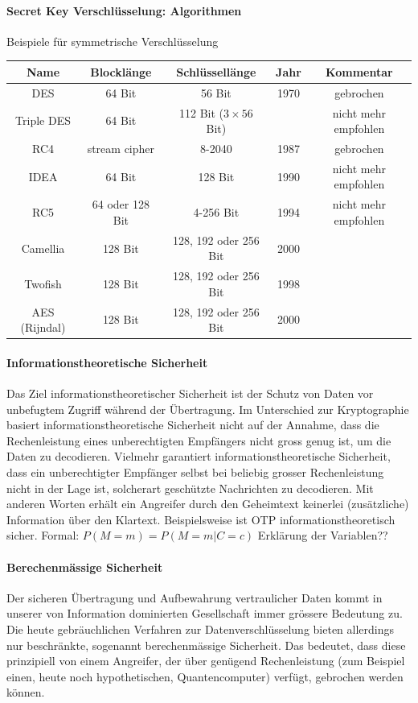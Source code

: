 \documentclass[10pt,a4paper]{article}
\begin{document}
\paragraph*{Secret Key Verschlüsselung: Algorithmen}Beispiele für symmetrische Verschlüsselung \newline
\begin{tabular}{|c|c|c|c|c|}
    \hline
    Name&Blocklänge&Schlüssellänge&Jahr&Kommentar\\
    \hline
    DES&64 Bit&56 Bit&1970&gebrochen\\
    Triple DES&64 Bit&112 Bit ($3\times56$ Bit)&  &nicht mehr empfohlen\\
    RC4&stream cipher&8-2040&1987&gebrochen\\
    IDEA&64 Bit&128 Bit&1990&nicht mehr empfohlen\\
    RC5&64 oder 128 Bit&4-256 Bit&1994&nicht mehr empfohlen\\
    Camellia&128 Bit&128, 192 oder 256 Bit&2000& \\
    Twofish&128 Bit&128, 192 oder 256 Bit&1998& \\
    AES (Rijndal)&128 Bit&128, 192 oder 256 Bit&2000& \\
    \hline
\end{tabular}

\paragraph*{Informationstheoretische Sicherheit}Das Ziel informationstheoretischer Sicherheit ist der Schutz von Daten vor unbefugtem Zugriff während der Übertragung. Im Unterschied zur Kryptographie basiert informationstheoretische Sicherheit nicht auf der Annahme, dass die Rechenleistung eines unberechtigten Empfängers nicht gross genug ist, um die Daten zu decodieren. Vielmehr garantiert informationstheoretische Sicherheit, dass ein unberechtigter Empfänger selbst bei beliebig grosser Rechenleistung nicht in der Lage ist, solcherart geschützte Nachrichten zu decodieren. Mit anderen Worten erhält ein Angreifer durch den Geheimtext keinerlei (zusätzliche) Information über den Klartext\cite{renner2006}.
 Beispielsweise ist OTP informationstheoretisch sicher. \newline %
Formal:
\begin{math}
    P(M=m) = P(M=m|C=c)
\end{math} {\color{red}Erklärung der Variablen??}

\paragraph*{Berechenmässige Sicherheit}\label{para:Berechenmässige Sicherheit}Der sicheren Übertragung und Aufbewahrung vertraulicher Daten kommt in unserer von Information dominierten Gesellschaft immer grössere Bedeutung zu. Die heute gebräuchlichen Verfahren zur Datenverschlüsselung bieten allerdings nur beschränkte, sogenannt berechenmässige Sicherheit. Das bedeutet, dass diese prinzipiell von einem Angreifer, der über genügend Rechenleistung (zum Beispiel einen, heute noch hypothetischen, Quantencomputer) verfügt, gebrochen werden können\cite{renner2006}.
\end{document}

